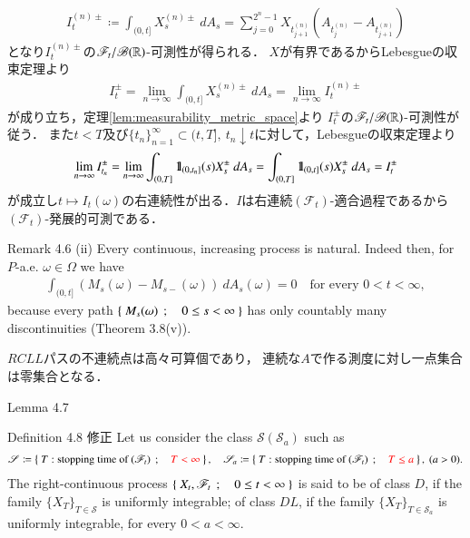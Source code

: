 \begin{prf}
\begin{align}
			I^{(n)\pm}_t \coloneqq \int_{(0,t]} X^{(n)\pm}_s\ dA_s
			= \sum_{j=0}^{2^n-1} X_{t^{(n)}_{j+1}} \left(A_{t^{(n)}_j} - A_{t^{(n)}_{j+1}}\right)
		\end{align}
		となり$I^{(n)\pm}_t$の$\mathscr{F}_t/\mathscr{B}(\mathbb{R})$-可測性が得られる．
		$X$が有界であるからLebesgueの収束定理より
		\begin{align}
			I^{\pm}_t = \lim_{n \to \infty} \int_{(0,t]} X^{(n)\pm}_s\ dA_s
			= \lim_{n \to \infty} I^{(n)\pm}_t
		\end{align}
		が成り立ち，定理\ref{lem:measurability_metric_space}より
		$I^{\pm}_t$の$\mathscr{F}_t/\mathscr{B}(\mathbb{R})$-可測性が従う．
		また$t<T$及び$\{t_n\}_{n=1}^\infty \subset (t,T],\ t_n \downarrow t$に対して，Lebesgueの収束定理より
		\begin{align}
			\lim_{n \to \infty} I^\pm_{t_n}
			= \lim_{n \to \infty} \int_{(0,T]} \mbox{1}\hspace{-0.25em}\mbox{l}_{(0,t_n]}(s)X^\pm_s\ dA_s
			= \int_{(0,T]} \mbox{1}\hspace{-0.25em}\mbox{l}_{(0,t]}(s)X^\pm_s\ dA_s
			= I^\pm_t
		\end{align}
		が成立し$t \longmapsto I_t(\omega)$の右連続性が出る．$I$は右連続$(\mathscr{F}_t)$-適合過程であるから
		$(\mathscr{F}_t)$-発展的可測である．
		\QED
	\end{prf}
	
	\begin{itembox}[l]{Remark 4.6 (ii)}
		Every continuous, increasing process is natural. Indeed then, for $P$-a.e. $\omega \in \Omega$
		we have
		\begin{align}
			\int_{(0,t]} (M_s(\omega)-M_{s-}(\omega))\ dA_s(\omega) = 0
			\quad \mbox{for every $0 < t < \infty$},
		\end{align}
		because every path $\left\{\ M_s(\omega)\ \, ; \quad 0 \leq s < \infty\ \right\}$ has only countably many discontinuities
		(Theorem 3.8(v)).
	\end{itembox}
	
	\begin{prf}
		$RCLL$パスの不連続点は高々可算個であり，
		連続な$A$で作る測度に対し一点集合は零集合となる．
		\QED
	\end{prf}
	
	\begin{itembox}[l]{Lemma 4.7}
		
	\end{itembox}
	
	\begin{itembox}[l]{Definition 4.8 修正}
		Let us consider the class $\mathscr{S}(\mathscr{S}_a)$ such as
		\begin{align}
			\mathscr{S} \coloneqq \left\{\ T:\mbox{stopping time of $(\mathscr{F}_t)$}\ \, ; \quad \textcolor{red}{T < \infty}\ \right\},
			\quad \mathscr{S}_a \coloneqq \left\{\ T:\mbox{stopping time of $(\mathscr{F}_t)$}\ \, ; \quad \textcolor{red}{T \leq a}\ \right\},\ (a > 0).
		\end{align}
		The right-continuous process $\left\{\ X_t,\mathscr{F}_t\ \, ; \quad 0 \leq t < \infty\ \right\}$ is said to be 
		of class $D$, if the family $\{X_T\}_{T \in \mathscr{S}}$ is uniformly integrable;
		of class $DL$, if the family $\{X_T\}_{T \in \mathscr{S}_a}$ is uniformly integrable,
		for every $0 < a < \infty$.
	\end{itembox}
	
